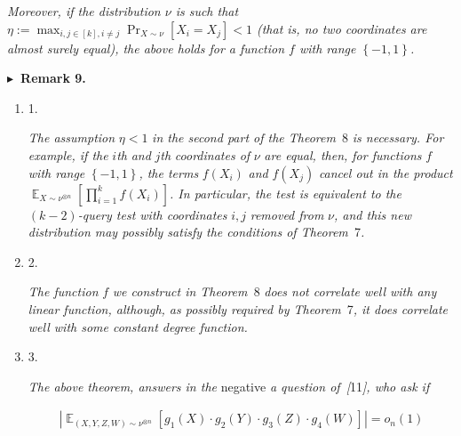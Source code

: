 \emph{Moreover, if the distribution $\nu$ is such that $\eta:=\max_{i,j\in[k],i\not=j}\Pr_{X\sim\nu}\left[X_{i}=X_{j}\right]<1$ (that is, no two coordinates are almost surely equal), the above holds for a function $f$ with range $\left\{-1,1\right\}$.}\par







\par\medskip\noindent\textbf{
$\blacktriangleright$ Remark 9.
}\par



\begin{enumerate}


\item[] 
1. 


\emph{The assumption }$\eta<1$\emph{ in the second part of the Theorem }8\emph{ is necessary.
For example, if the }$i$\emph{th}\emph{ and }$j$\emph{th}\emph{ coordinates of }$\nu$\emph{ are equal, then, for functions }$f$\emph{ with range }$\left\{-1,1\right\}$\emph{, the terms }$f(X_{i})$\emph{ and }$f(X_{j})$\emph{ cancel out in the product }$\mathop{\mathbb{E}}_{X\sim\nu^{\otimes n}}\left[\prod_{i=1}^{k}f(X_{i})\right]$\emph{.
In particular, the test is equivalent to the }$(k-2)$\emph{-query test with coordinates }$i,j$\emph{ removed from }$\nu$\emph{, and this new distribution may possibly satisfy the conditions of Theorem }7\emph{.}\par





\item[] 
2. 


\emph{The function }$f$\emph{ we construct in Theorem }8\emph{ does not correlate well with any linear function, although, as possibly required by Theorem }7\emph{, it does correlate well with some constant degree function.}\par





\item[] 
3. 


\emph{The above theorem, answers in the }negative\emph{ a question of }\emph{[}11\emph{]}\emph{, who ask if}\par


\[\begin{gathered}
\left|\mathop{\mathbb{E}}_{(X,Y,Z,W)\sim\nu^{\otimes n}}\left[g_{1}(X)\cdot g_{2}(Y)\cdot g_{3}(Z)\cdot g_{4}(W)\right]\right|=o_{n}(1)
\end{gathered}\]



\end{enumerate}
